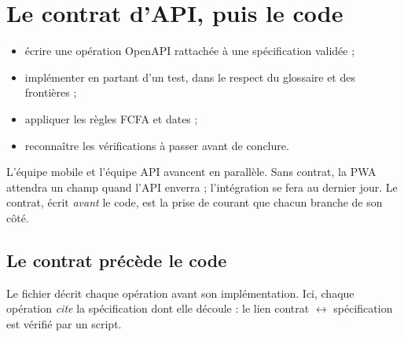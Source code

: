 \chapter{Le contrat d'API, puis le code}\label{ch:contrat}

\begin{objectifs}
\begin{itemize}
  \item écrire une opération OpenAPI rattachée à une spécification validée ;
  \item implémenter en partant d'un test, dans le respect du glossaire et des frontières ;
  \item appliquer les règles FCFA et dates ;
  \item reconnaître les vérifications à passer avant de conclure.
\end{itemize}
\end{objectifs}

\begin{situation}
L'équipe mobile et l'équipe API avancent en parallèle. Sans contrat, la PWA attendra un champ
 quand l'API enverra  ; l'intégration se fera au dernier jour. Le contrat, écrit
\emph{avant} le code, est la prise de courant que chacun branche de son côté.
\end{situation}

\section{Le contrat précède le code}
\begin{concept}
Le fichier  décrit chaque opération avant son implémentation. Ici, chaque opération \emph{cite}
la spécification dont elle découle : le lien contrat $\leftrightarrow$ spécification est vérifié par un script.
\end{concept}

